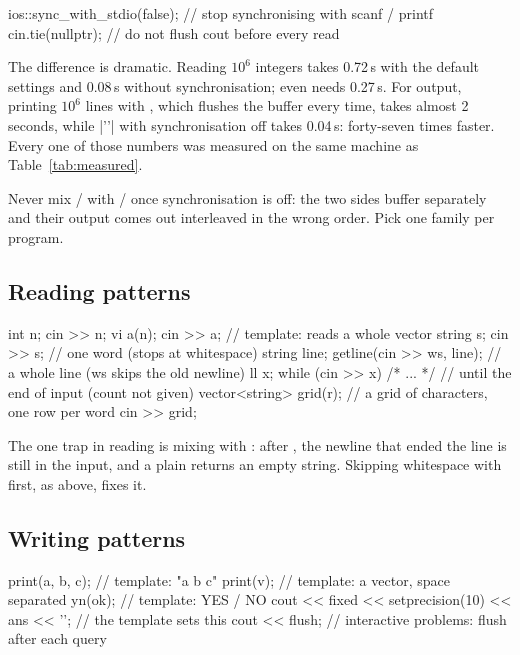\begin{code}
ios::sync_with_stdio(false);  // stop synchronising with scanf / printf
cin.tie(nullptr);             // do not flush cout before every read
\end{code}

The difference is dramatic. Reading $10^6$ integers takes 0.72\,s with the default settings and 0.08\,s without
synchronisation; even  needs 0.27\,s. For output, printing $10^6$ lines with , which flushes the buffer
every time, takes almost 2 seconds, while \cc|'\n'| with synchronisation off takes 0.04\,s: forty-seven times faster. Every
one of those numbers was measured on the same machine as Table~\ref{tab:measured}.

\begin{pitfall}
Never mix / with / once synchronisation is off: the two sides buffer separately and
their output comes out interleaved in the wrong order. Pick one family per program.
\end{pitfall}

\subsection{Reading patterns}

\begin{code}
int n;
cin >> n;
vi a(n);
cin >> a;                     // template: reads a whole vector
string s;
cin >> s;                     // one word (stops at whitespace)
string line;
getline(cin >> ws, line);     // a whole line (ws skips the old newline)
ll x;
while (cin >> x) { /* ... */ }  // until the end of input (count not given)
vector<string> grid(r);       // a grid of characters, one row per word
cin >> grid;
\end{code}

The one trap in reading is mixing \cc{>>} with : after , the newline that ended the line is still
in the input, and a plain  returns an empty string. Skipping whitespace with  first, as above, fixes
it.

\subsection{Writing patterns}

\begin{code}
print(a, b, c);               // template: "a b c\n"
print(v);                     // template: a vector, space separated
yn(ok);                       // template: YES / NO
cout << fixed << setprecision(10) << ans << '\n';  // the template sets this
cout << flush;                // interactive problems: flush after each query
\end{code}

